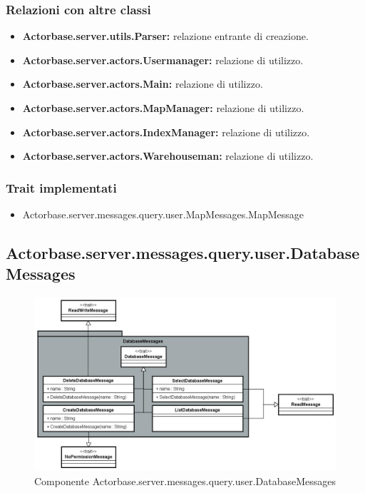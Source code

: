 \documentclass[a4paper]{article}
\begin{document}
			\subsubsection{Relazioni con altre classi}
				\begin{itemize}
					\item \textbf{Actorbase.server.utils.Parser:} relazione entrante di creazione.
					\item \textbf{Actorbase.server.actors.Usermanager:} relazione di utilizzo.
					\item \textbf{Actorbase.server.actors.Main:} relazione di utilizzo.
					\item \textbf{Actorbase.server.actors.MapManager:} relazione di utilizzo.
					\item \textbf{Actorbase.server.actors.IndexManager:} relazione di utilizzo.
					\item \textbf{Actorbase.server.actors.Warehouseman:} relazione di utilizzo.
				\end{itemize}
			\subsubsection{Trait implementati}
				\begin{itemize}
					\item Actorbase.server.messages.query.user.MapMessages.MapMessage
				\end{itemize}
				
		\subsection{Actorbase.server.messages.query.user.DatabaseMessages}
		
			\begin{figure}[H]
				\centering
				\includegraphics[width=\textwidth]{ST/Server/databaseMessagesLevel.jpg}
				\caption{Componente Actorbase.server.messages.query.user.DatabaseMessages}
			\end{figure}
			
\end{document}
